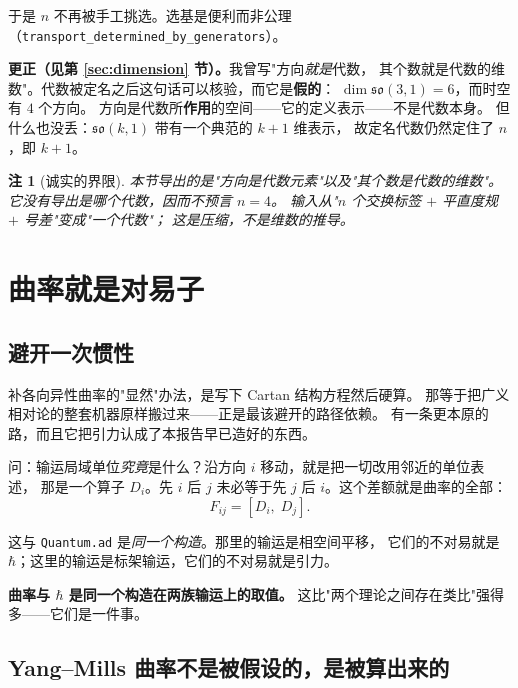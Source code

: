 \documentclass[11pt,a4paper]{article}
\theoremstyle{sudef}
\newtheorem{remark}[theorem]{注}
\begin{document}
于是 $n$ 不再被手工挑选。选基是便利而非公理
（\texttt{transport\_determined\_by\_generators}）。

\begin{mdframed}[linecolor=red!60!black,linewidth=0.9pt,backgroundcolor=red!3]
\textbf{更正（见第 \ref{sec:dimension} 节）。}我曾写"方向\emph{就是}代数，
其个数就是代数的维数"。代数被定名之后这句话可以核验，而它是\textbf{假的}：
$\dim\mathfrak{so}(3,1)=6$，而时空有 $4$ 个方向。
方向是代数所\textbf{作用}的空间——它的定义表示——不是代数本身。
但什么也没丢：$\mathfrak{so}(k,1)$ 带有一个典范的 $k+1$ 维表示，
故定名代数仍然定住了 $n$，即 $k+1$。
\end{mdframed}

\begin{remark}[诚实的界限]
本节导出的是"方向\emph{是}代数元素"以及"其个数\emph{是}代数的维数"。
它\emph{没有}导出是\emph{哪个}代数，因而不预言 $n=4$。
输入从"$n$ 个交换标签 $+$ 平直度规 $+$ 号差"变成"一个代数"；
这是压缩，不是维数的推导。
\end{remark}

\section{曲率就是对易子}\label{sec:conn}

\subsection{避开一次惯性}

补各向异性曲率的"显然"办法，是写下 Cartan 结构方程然后硬算。
那等于把广义相对论的整套机器原样搬过来——正是最该避开的路径依赖。
有一条更本原的路，而且它把引力认成了本报告早已造好的东西。

问：输运局域单位\emph{究竟}是什么？沿方向 $i$ 移动，就是把一切改用邻近的单位表述，
那是一个算子 $D_i$。先 $i$ 后 $j$ 未必等于先 $j$ 后 $i$。这个差额就是曲率的全部：
\[
F_{ij} = [D_i,\;D_j].
\]

这与 \texttt{Quantum.ad} 是\emph{同一个构造}。那里的输运是相空间平移，
它们的不对易就是 $\hbar$；这里的输运是标架输运，它们的不对易就是引力。

\begin{mdframed}[linecolor=axcol,linewidth=0.9pt,backgroundcolor=axcol!4]
\textbf{曲率与 $\hbar$ 是同一个构造在两族输运上的取值。}
这比"两个理论之间存在类比"强得多——它们是一件事。
\end{mdframed}

\subsection{Yang--Mills 曲率不是被假设的，是被算出来的}
\end{document}
